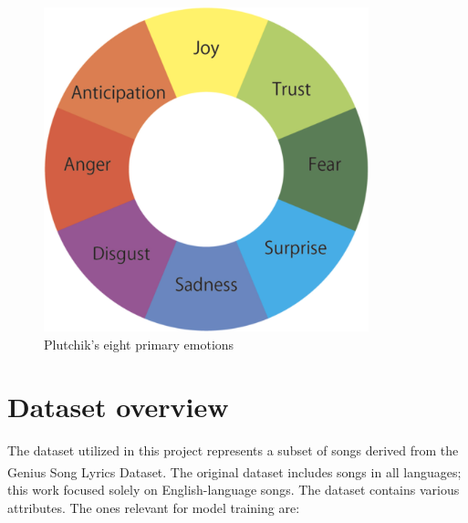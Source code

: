 \begin{figure}[H]
    \centering
    \includegraphics[scale= 0.5]{pictures/plutchik_primary_emotions.png}
    \caption{Plutchik's eight primary emotions}
    \label{fig:primary_emotions}
\end{figure}




\section*{Dataset overview}
The dataset utilized in this project represents a subset of songs
derived from the Genius Song Lyrics Dataset\textsuperscript{\cite{geniusdataset}}.
The original dataset includes songs in all languages; this work focused
solely on English-language songs.
The dataset contains various attributes. The ones relevant
for model training are:

